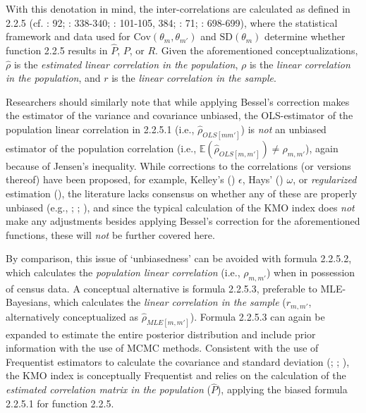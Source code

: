 \documentclass[
  10pt,
  a4paper,
  twoside]{article}
\begin{document}
With this denotation in mind, the inter-correlations are calculated as defined in 2.2.5 (cf. : 92; : 338-340; : 101-105, 384; : 71; : 698-699), where the statistical framework and data used for \(\text{Cov}(\theta_m, \theta_{m'})\) and \(\text{SD}(\theta_m)\) determine whether function 2.2.5 results in \(\hat{P}\), \(P\), or \(R\). Given the aforementioned conceptualizations, \(\hat{\rho}\) is the \emph{estimated linear correlation in the population}, \(\rho\) is the \emph{linear correlation in the population}, and \(r\) is the \emph{linear correlation in the sample}.

Researchers should similarly note that while applying Bessel's correction makes the estimator of the variance and covariance unbiased, the OLS-estimator of the population linear correlation in 2.2.5.1 (i.e., \(\hat{\rho}_{OLS[mm']}\)) is \emph{not} an unbiased estimator of the population correlation (i.e., \(\mathbb{E}(\hat{\rho}_{OLS[m,m']}) \neq \rho_{m,m'}\)), again because of Jensen's inequality. While corrections to the correlations (or versions thereof) have been proposed, for example, Kelley's () \(\epsilon\), Hays' () \(\omega\), or \emph{regularized} estimation (), the literature lacks consensus on whether any of these are properly unbiased (e.g., ; ; ), and since the typical calculation of the KMO index does \emph{not} make any adjustments besides applying Bessel's correction for the aforementioned functions, these will \emph{not} be further covered here.

By comparison, this issue of `unbiasedness' can be avoided with formula 2.2.5.2, which calculates the \emph{population linear correlation} (i.e., \(\rho_{m,m'}\)) when in possession of census data. A conceptual alternative is formula 2.2.5.3, preferable to MLE-Bayesians, which calculates the \emph{linear correlation in the sample} (\(r_{m,m'}\), alternatively conceptualized as \(\hat{\rho}_{MLE[m,m']}\)). Formula 2.2.5.3 can again be expanded to estimate the entire posterior distribution and include prior information with the use of MCMC methods. Consistent with the use of Frequentist estimators to calculate the covariance and standard deviation (; ; ), the KMO index is conceptually Frequentist and relies on the calculation of the \emph{estimated correlation matrix in the population} (\(\hat{P}\)), applying the biased formula 2.2.5.1 for function 2.2.5.
\end{document}
